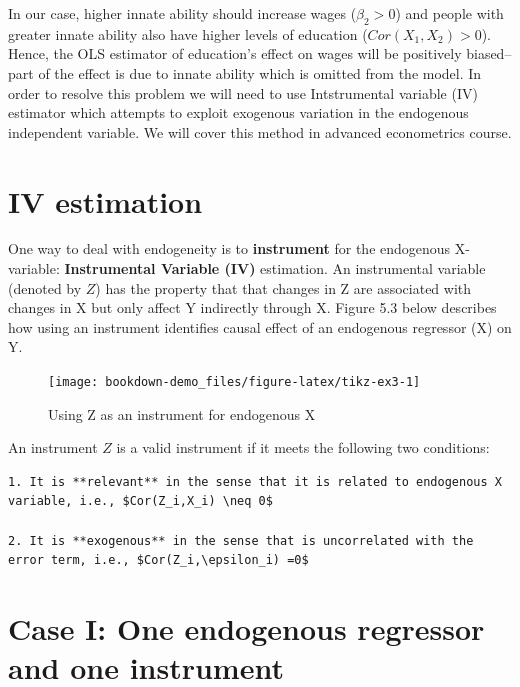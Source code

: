 \documentclass[
]{book}
\theoremstyle{definition}
\theoremstyle{definition}
\theoremstyle{definition}
\theoremstyle{definition}
\theoremstyle{remark}
\begin{document}
In our case, higher innate ability should increase wages (\(\beta_2>0\)) and people with greater innate ability also have higher levels of education (\(Cor(X_1,X_2)>0\)). Hence, the OLS estimator of education's effect on wages will be positively biased--part of the effect is due to innate ability which is omitted from the model. In order to resolve this problem we will need to use Intstrumental variable (IV) estimator which attempts to exploit exogenous variation in the endogenous independent variable. We will cover this method in advanced econometrics course.

\hypertarget{iv-estimation}{%
\section{IV estimation}\label{iv-estimation}}

One way to deal with endogeneity is to \textbf{instrument} for the endogenous X-variable: \textbf{Instrumental Variable (IV)} estimation. An instrumental variable (denoted by \(Z\)) has the property that that changes in Z are associated with changes in X but only affect Y indirectly through X. Figure 5.3 below describes how using an instrument identifies causal effect of an endogenous regressor (X) on Y.

\begin{figure}

{\centering \texttt{[image: bookdown-demo\_files/figure-latex/tikz-ex3-1]} 

}

\caption{Using Z as an instrument for endogenous X}\label{fig:tikz-ex3}
\end{figure}

An instrument \(Z\) is a valid instrument if it meets the following two conditions:

\begin{verbatim}
1. It is **relevant** in the sense that it is related to endogenous X variable, i.e., $Cor(Z_i,X_i) \neq 0$

2. It is **exogenous** in the sense that is uncorrelated with the error term, i.e., $Cor(Z_i,\epsilon_i) =0$
\end{verbatim}

\hypertarget{case-i-one-endogenous-regressor-and-one-instrument}{%
\section{Case I: One endogenous regressor and one instrument}\label{case-i-one-endogenous-regressor-and-one-instrument}}
\end{document}
